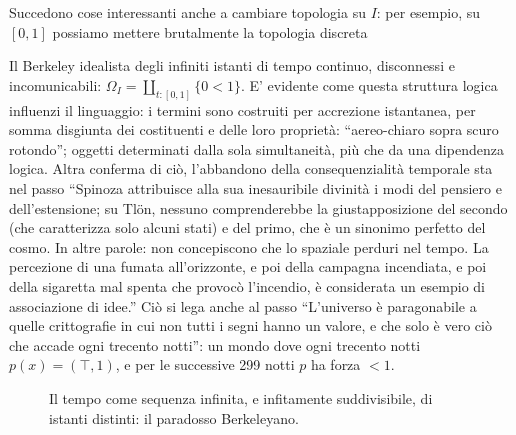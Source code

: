 Succedono cose interessanti anche a cambiare topologia su $I$: per esempio, su $[0,1]$ possiamo mettere brutalmente la topologia discreta
\begin{example}
  Il Berkeley idealista degli infiniti istanti di tempo continuo, disconnessi e incomunicabili: $\Omega_I = \coprod_{t : [0,1]} \{ 0 < 1 \}$. E' evidente come questa struttura logica influenzi il linguaggio: i termini sono costruiti per accrezione istantanea, per somma disgiunta dei costituenti e delle loro proprietà: ``aereo-chiaro sopra scuro rotondo''; oggetti determinati dalla sola simultaneità, più che da una dipendenza logica. Altra conferma di ciò, l'abbandono della consequenzialità temporale sta nel passo ``Spinoza attribuisce alla sua inesauribile divinità i modi del pensiero e dell'estensione; su Tlön, nessuno comprenderebbe la giustapposizione del  secondo (che caratterizza solo alcuni stati) e del primo, che è un sinonimo  perfetto del cosmo. In altre parole: non concepiscono che lo spaziale perduri  nel tempo. La percezione di una fumata all'orizzonte, e poi della campagna  incendiata, e poi della sigaretta mal spenta che provocò l'incendio, è  considerata un esempio di associazione di idee.'' Ciò si lega anche al passo ``L'universo è paragonabile a quelle crittografie in cui non tutti i segni hanno un valore, e che solo è vero ciò che accade ogni trecento notti'': un mondo dove ogni trecento notti $p(x) =(\top,1)$, e per le successive 299 notti $p$ ha forza $<1$.
  \begin{center}
\begin{figure}
\caption{Il tempo come sequenza infinita, e infitamente suddivisibile, di istanti distinti: il paradosso Berkeleyano.}
\end{figure}
  \end{center}
\end{example}
\begin{example}
  
\end{example}
